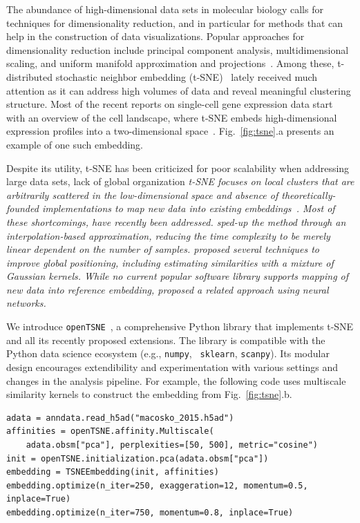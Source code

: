 \documentclass{bioinfo}
\newcommand{\opentsne}[0]{{\tt openTSNE}\ }
\begin{document}
The abundance of high-dimensional data sets in molecular biology calls for
techniques for dimensionality reduction, and in particular for methods that can
help in the construction of data visualizations. Popular approaches for
dimensionality reduction include principal component analysis, multidimensional
scaling, and uniform manifold approximation and projections~\citep{umap}. Among
these, t-distributed stochastic neighbor embedding
(t-SNE)~\citep{tsne} lately received much attention as it can
address high volumes of data and reveal meaningful clustering structure. Most
of the recent reports on single-cell gene expression data start with an
overview of the cell landscape, where t-SNE embeds high-dimensional expression
profiles into a two-dimensional space~\citep{Macosko2015, Shekhar2016}.
Fig.~\ref{fig:tsne}.a presents an example of one such embedding.

Despite its utility, t-SNE has been criticized for poor scalability
when addressing large data sets, lack of global organization \em t-SNE
focuses on local clusters that are arbitrarily scattered in the
low-dimensional space \em and absence of theoretically-founded implementations to
map new data into existing embeddings~\citep{ding2018interpretable,becht2019dimensionality}. Most of these shortcomings, have
recently been addressed.
\citet{fi_tsne} sped-up the method through an interpolation-based
approximation, reducing the time complexity to be merely linear dependent on the number of samples. \citet{art_of_using_tsne} proposed
several techniques to improve global positioning, including estimating similarities with a mixture of
Gaussian kernels. While no current popular
software library supports mapping of new data into reference embedding,
\citet{parametric_tsne} proposed a related approach
using neural networks.

We introduce \opentsne, a comprehensive Python library that
implements t-SNE and all its recently proposed extensions. The library is
compatible with the Python data science ecosystem (e.g., {\tt numpy}, {\tt
sklearn}, {\tt scanpy}). Its modular design encourages extendibility and
experimentation with various settings and changes in the analysis pipeline. For
example, the following code uses multiscale similarity kernels to construct the
embedding from Fig.~\ref{fig:tsne}.b.

\begin{lstlisting}
adata = anndata.read_h5ad("macosko_2015.h5ad")
affinities = openTSNE.affinity.Multiscale(
	adata.obsm["pca"], perplexities=[50, 500], metric="cosine")
init = openTSNE.initialization.pca(adata.obsm["pca"])
embedding = TSNEEmbedding(init, affinities)
embedding.optimize(n_iter=250, exaggeration=12, momentum=0.5, inplace=True)
embedding.optimize(n_iter=750, momentum=0.8, inplace=True)
\end{lstlisting}
\end{document}
